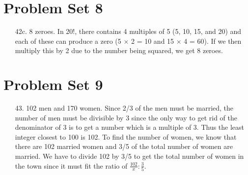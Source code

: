 \documentclass[12pt]{article}
\begin{document}
\section*{Problem Set 8}
\begin{itemize}
    \item [42c.]
        8 zeroes. In 20!, there contains 4 multiples of 5 (5, 10, 15, and 20) and each
        of these can produce a zero (5 $\times$ 2 = 10 and 15 $\times$ 4 = 60). If we
        then multiply this by 2 due to the number being squared, we get 8 zeroes.
\end{itemize}

\section*{Problem Set 9}
\begin{itemize}
    \item [43.]
        102 men and 170 women. Since 2/3 of the men must be married, the number of men
        must be divisible by 3 since the only way to get rid of the denominator of 3
        is to get a number which is a multiple of 3. Thus the least integer closest to
        100 is 102. To find the number of women, we know that there are 102 married
        women and 3/5 of the total number of women are married. We have to divide 102 by
        3/5 to get the total number of women in the town since it must fit the ratio of
        $\frac{102}{x} : \frac{3}{5}$.
\end{itemize}
\end{document}
